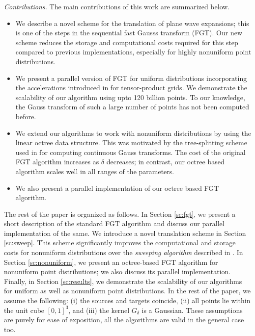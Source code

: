 {\em Contributions.} The main contributions of this work are summarized below.
\begin{itemize} 
%
\item We describe a novel scheme for the translation of plane wave expansions; this is one of the steps in the
 sequential fast Gausss transform (FGT). Our new scheme reduces the storage and computational costs required for this step compared to previous implementations, especially for highly nonuniform point distributions.
%
\item We present a parallel version of FGT for uniform distributions incorporating the accelerations introduced in \cite{fggt} for tensor-product grids. We demonstrate the scalability of our algorithm using  upto 120 billion points. To our knowledge, the Gauss transform of such a large number of points has not been computed before.
%
\item We extend our algorithms to work with nonuniform distributions by using the linear octree data structure. This was motivated by the tree-splitting scheme used in \cite{veerapaneni08} for computing continuous Gauss transforms. The cost of the original FGT algorithm increases as $\delta$ decreases; in contrast, our octree based algorithm scales well in all ranges of the parameters.

\item We also present a parallel implementation of our octree based FGT algorithm.
%
\end{itemize}

The rest of the paper is organized as follows. In Section \ref{sc:fgt}, we present a short description of the
 standard FGT algorithm and discuss our parallel implementation of the same. We introduce a novel translation scheme 
 in Section \ref{sc:sweep}. This scheme significantly improves the computational and storage costs for 
 nonuniform distributions over the {\em sweeping algorithm} described in \cite{greengard98}. In Section \ref{sc:nonuniform}, we present an octree-based FGT algorithm for nonuniform point distributions; we also discuss
 its parallel implementation. Finally, in Section \ref{sc:results}, we demonstrate the scalability of our algorithms 
 for uniform as well as nonuniform point distributions. In the rest of the paper, we assume the following: (i) the 
 sources and targets coincide, (ii) all points lie within the unit cube $[0, 1]^3$, and (iii) the kernel $G_\delta$ is a Gaussian. These
 assumptions are purely for ease of exposition, all the algorithms are valid in the general case too. 
 

